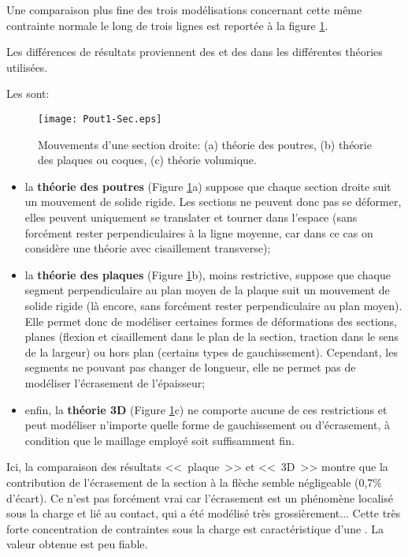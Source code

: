 Une comparaison plus fine des trois modélisations concernant cette même contrainte normale 
le long de trois lignes est reportée à la figure \ref{Pout1-sec}.

\medskip
Les différences de résultats proviennent des  
et des  dans les différentes théories utilisées.

\medskip
Les  sont:
\begin{figure}[ht]
\begin{center}
\texttt{[image: Pout1-Sec.eps]}
\end{center}
\caption{\label{Pout1-sec} Mouvements d'une section droite: (a) théorie des poutres, 
(b) théorie des plaques ou coques, (c) théorie volumique.}
\end{figure}
\begin{itemize}
   \item la \textbf{théorie des poutres} (Figure \ref{Pout1-sec}a) suppose que chaque section droite 
	suit un mouvement de solide rigide. Les sections ne peuvent donc pas se déformer, 
	elles peuvent uniquement se translater et tourner dans l'espace (sans forcément rester 
	perpendiculaires à la ligne moyenne, car dans ce cas on considère une théorie avec 
	cisaillement transverse);
   \item la \textbf{théorie des plaques} (Figure \ref{Pout1-sec}b), moins restrictive, suppose que chaque 
	segment perpendiculaire au plan moyen de la plaque suit un mouvement de solide rigide 
	(là encore, sans forcément rester perpendiculaire au plan moyen). Elle permet donc de 
	modéliser certaines formes de déformations des sections, planes (flexion et cisaillement 
	dans le plan de la section, traction dans le sens de la largeur) ou hors plan (certains types 
	de gauchissement). Cependant, les segments ne pouvant pas changer de longueur, elle ne 
	permet pas de modéliser l'écrasement de l'épaisseur;
   \item enfin, la \textbf{théorie 3D} (Figure \ref{Pout1-sec}c) ne comporte aucune de ces restrictions et peut 
	modéliser n'importe quelle forme de gauchissement ou d'écrasement, à condition que le 
	maillage employé soit suffisamment fin.
\end{itemize}

\medskip
Ici, la comparaison des résultats <<~plaque~>> et <<~3D~>> montre que la contribution de 
l'écrasement de la section à la flèche semble négligeable (0,7\% d'écart).
Ce n'est pas forcément vrai car l'écrasement est un phénomène localisé sous la charge 
et lié au contact, qui a été modélisé très grossièrement... 
Cette très forte concentration de contraintes sous la charge est caractéristique d'une 
. La valeur obtenue est peu fiable.



